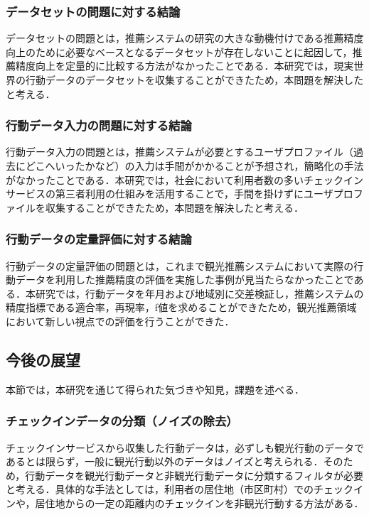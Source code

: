 \documentclass{jsarticle}
\begin{document}
\subsubsection{データセットの問題に対する結論}

データセットの問題とは，推薦システムの研究の大きな動機付けである推薦精度向上のために必要なベースとなるデータセットが存在しないことに起因して，推薦精度向上を定量的に比較する方法がなかったことである．本研究では，現実世界の行動データのデータセットを収集することができたため，本問題を解決したと考える．

\subsubsection{行動データ入力の問題に対する結論}

行動データ入力の問題とは，推薦システムが必要とするユーザプロファイル（過去にどこへいったかなど）の入力は手間がかかることが予想され，簡略化の手法がなかったことである．本研究では，社会において利用者数の多いチェックインサービスの第三者利用の仕組みを活用することで，手間を掛けずにユーザプロファイルを収集することができたため，本問題を解決したと考える．

\subsubsection{行動データの定量評価に対する結論}
行動データの定量評価の問題とは，これまで観光推薦システムにおいて実際の行動データを利用した推薦精度の評価を実施した事例が見当たらなかったことである．本研究では，行動データを年月および地域別に交差検証し，推薦システムの精度指標である適合率，再現率，f値を求めることができたため，観光推薦領域において新しい視点での評価を行うことができた．

\subsection{今後の展望}

本節では，本研究を通じて得られた気づきや知見，課題を述べる．

\subsubsection{チェックインデータの分類（ノイズの除去）}

チェックインサービスから収集した行動データは，必ずしも観光行動のデータであるとは限らず，一般に観光行動以外のデータはノイズと考えられる．そのため，行動データを観光行動データと非観光行動データに分類するフィルタが必要と考える．具体的な手法としては，利用者の居住地（市区町村）でのチェックインや，居住地からの一定の距離内のチェックインを非観光行動する方法がある．
\end{document}
